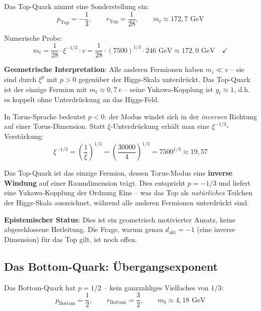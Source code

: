 Das Top-Quark nimmt eine Sonderstellung ein:
\begin{equation}
    p_{\text{Top}} = -\frac{1}{3}, \qquad
    r_{\text{Top}} = \frac{1}{28}, \qquad
    m_t \approx 172{,}7 \text{ GeV}
\end{equation}

Numerische Probe:
\begin{equation}
    m_t = \frac{1}{28} \cdot \xi^{-1/3} \cdot v
    = \frac{1}{28} \cdot (7500)^{1/3} \cdot 246 \text{ GeV}
    \approx 172{,}0 \text{ GeV} \quad \checkmark
\end{equation}

\textbf{Geometrische Interpretation}: Alle anderen Fermionen haben
$m_i \ll v$ -- sie sind durch $\xi^p$ mit $p > 0$ gegenüber der
Higgs-Skala unterdrückt. Das Top-Quark ist der einzige Fermion mit
$m_t \approx 0{,}7\,v$ -- seine Yukawa-Kopplung ist $y_t \approx 1$,
d.h. es koppelt ohne Unterdrückung an das Higgs-Feld.

In Torus-Sprache bedeutet $p < 0$: der Modus windet sich in der
\emph{inversen} Richtung auf einer Torus-Dimension. Statt
$\xi$-Unterdrückung erhält man eine $\xi^{-1/3}$-Verstärkung:
\begin{equation}
    \xi^{-1/3} = \left(\frac{1}{\xi}\right)^{1/3}
    = \left(\frac{30000}{4}\right)^{1/3}
    = 7500^{1/3} \approx 19{,}57
\end{equation}

\begin{predbox}
Das Top-Quark ist das einzige Fermion, dessen Torus-Modus eine
\textbf{inverse Windung} auf einer Raumdimension trägt. Dies
entspricht $p = -1/3$ und liefert eine Yukawa-Kopplung der Ordnung
Eins -- was das Top als \emph{natürliches} Teilchen der Higgs-Skala
auszeichnet, während alle anderen Fermionen unterdrückt sind.
\end{predbox}

\textbf{Epistemischer Status}: Dies ist ein geometrisch motivierter
Ansatz, keine abgeschlossene Herleitung. Die Frage, warum genau
$d_{\text{akt}} = -1$ (eine inverse Dimension) für das Top gilt,
ist noch offen.

\subsection{Das Bottom-Quark: Übergangsexponent}

Das Bottom-Quark hat $p = 1/2$ -- kein ganzzahliges Vielfaches
von $1/3$:
\begin{equation}
    p_{\text{Bottom}} = \frac{1}{2}, \qquad
    r_{\text{Bottom}} = \frac{3}{2}, \qquad
    m_b \approx 4{,}18 \text{ GeV}
\end{equation}

